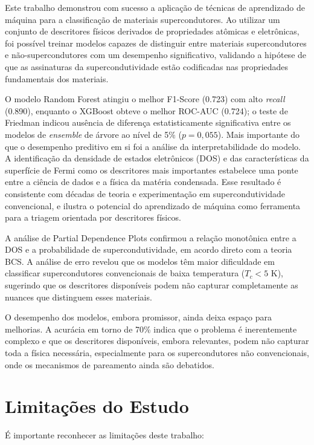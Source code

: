 \documentclass[12pt, a4paper, oneside]{report}
\begin{document}
Este trabalho demonstrou com sucesso a aplicação de técnicas de aprendizado de máquina para a classificação de materiais supercondutores. Ao utilizar um conjunto de descritores físicos derivados de propriedades atômicas e eletrônicas, foi possível treinar modelos capazes de distinguir entre materiais supercondutores e não-supercondutores com um desempenho significativo, validando a hipótese de que as assinaturas da supercondutividade estão codificadas nas propriedades fundamentais dos materiais.

O modelo Random Forest atingiu o melhor F1-Score (0.723) com alto \textit{recall} (0.890), enquanto o XGBoost obteve o melhor ROC-AUC (0.724); o teste de Friedman indicou ausência de diferença estatisticamente significativa entre os modelos de \textit{ensemble} de árvore ao nível de 5\% ($p = 0{,}055$). Mais importante do que o desempenho preditivo em si foi a análise da interpretabilidade do modelo. A identificação da densidade de estados eletrônicos (DOS) e das características da superfície de Fermi como os descritores mais importantes estabelece uma ponte entre a ciência de dados e a física da matéria condensada. Esse resultado é consistente com décadas de teoria e experimentação em supercondutividade convencional, e ilustra o potencial do aprendizado de máquina como ferramenta para a triagem orientada por descritores físicos.

A análise de Partial Dependence Plots confirmou a relação monotônica entre a DOS e a probabilidade de supercondutividade, em acordo direto com a teoria BCS. A análise de erro revelou que os modelos têm maior dificuldade em classificar supercondutores convencionais de baixa temperatura ($T_c < 5$ K), sugerindo que os descritores disponíveis podem não capturar completamente as nuances que distinguem esses materiais.

O desempenho dos modelos, embora promissor, ainda deixa espaço para melhorias. A acurácia em torno de 70\% indica que o problema é inerentemente complexo e que os descritores disponíveis, embora relevantes, podem não capturar toda a física necessária, especialmente para os supercondutores não convencionais, onde os mecanismos de pareamento ainda são debatidos.

\section{Limitações do Estudo}
\label{sec:limitacoes}

É importante reconhecer as limitações deste trabalho:
\end{document}
